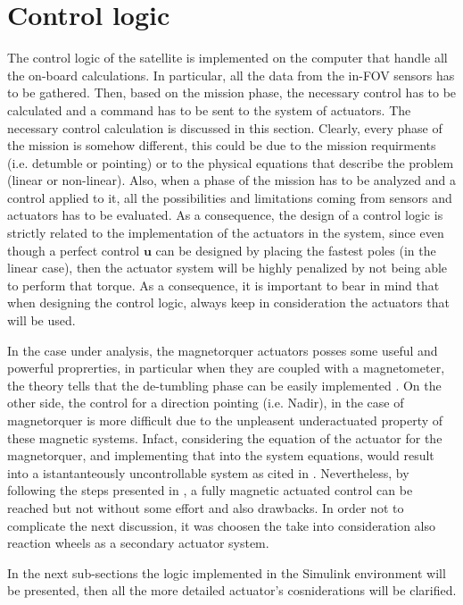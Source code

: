 \section{Control logic}
\label{sec:control_logic}
The control logic of the satellite is implemented on the computer that handle all the on-board calculations. In particular, all the data from the in-FOV sensors has to be 
gathered. Then, based on the mission phase, the necessary control has to be calculated and a command has to be sent to the system of actuators. The necessary control calculation is 
discussed in this section. Clearly, every phase of the mission is somehow different, this could be due to the mission requirments (i.e. detumble or pointing) or to the physical 
equations that describe the problem (linear or non-linear). Also, when a phase of the mission has to be analyzed and a control applied to it, all the possibilities and limitations 
coming from sensors and actuators has to be evaluated. As a consequence, the design of a control logic is strictly related to the implementation of the actuators in the system, since
even though a perfect control $\boldsymbol{u}$ can be designed by placing the fastest poles (in the linear case), then the actuator system will be highly penalized by not being able 
to perform that torque. As a consequence, it is important to bear in mind that when designing the control logic, always keep in consideration the actuators that will be used. 

In the case under analysis, the magnetorquer actuators posses some useful and powerful proprerties, in particular when they are coupled with a magnetometer, the theory tells that
the de-tumbling phase can be easily implemented \cite{bdot}. On the other side, the control for a direction pointing (i.e. Nadir), in the case of magnetorquer is more difficult due to the unpleasent
underactuated property of these magnetic systems. Infact, considering the equation of the actuator for the magnetorquer, and implementing that into the system equations, would result into a istantanteously
uncontrollable system as cited in \cite{lovera}. Nevertheless, by following the steps presented in \cite{lovera}, a fully magnetic actuated control can be reached but not without some 
effort and also drawbacks. In order not to complicate the next discussion, it was choosen the take into consideration also reaction wheels as a secondary actuator system.

In the next sub-sections the logic implemented in the Simulink environment will be presented, then all the more detailed actuator's cosniderations will be clarified. 
